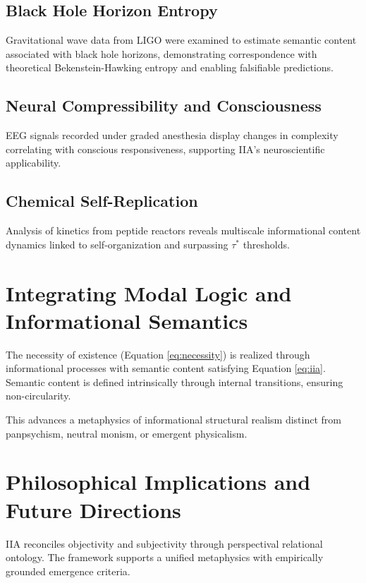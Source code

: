 \documentclass[12pt,a4paper]{article}
\begin{document}
\subsection{Black Hole Horizon Entropy}

Gravitational wave data from LIGO were examined to estimate semantic content associated with black hole horizons, demonstrating correspondence with theoretical Bekenstein-Hawking entropy and enabling falsifiable predictions.

\subsection{Neural Compressibility and Consciousness}

EEG signals recorded under graded anesthesia display changes in complexity correlating with conscious responsiveness, supporting IIA's neuroscientific applicability.

\subsection{Chemical Self-Replication}

Analysis of kinetics from peptide reactors reveals multiscale informational content dynamics linked to self-organization and surpassing $\tau^{*}$ thresholds.

\section{Integrating Modal Logic and Informational Semantics}

The necessity of existence (Equation \ref{eq:necessity}) is realized through informational processes with semantic content satisfying Equation \ref{eq:iia}. Semantic content is defined intrinsically through internal transitions, ensuring non-circularity.

This advances a metaphysics of informational structural realism distinct from panpsychism, neutral monism, or emergent physicalism.

\section{Philosophical Implications and Future Directions}

IIA reconciles objectivity and subjectivity through perspectival relational ontology. The framework supports a unified metaphysics with empirically grounded emergence criteria.
\end{document}
